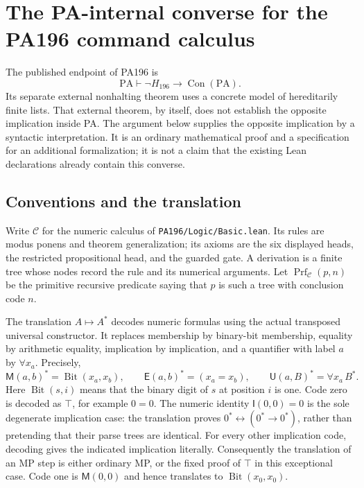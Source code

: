 \section{The PA-internal converse for the PA196 command calculus}
\label{sec:internal-converse}

The published endpoint of PA196 is
\[
  \mathrm{PA}\vdash \neg H_{196}\longrightarrow\operatorname{Con}(\mathrm{PA}).
\]
Its separate external nonhalting theorem uses a concrete model of hereditarily
finite lists.  That external theorem, by itself, does not establish the
opposite implication inside PA.  The argument below supplies the opposite
implication by a syntactic interpretation.  It is an ordinary mathematical
proof and a specification for an additional formalization; it is not a claim
that the existing Lean declarations already contain this converse.

\subsection{Conventions and the translation}

Write $\mathcal C$ for the numeric calculus of
\texttt{PA196/Logic/Basic.lean}. Its rules are modus ponens and theorem
generalization; its axioms are the six displayed heads, the restricted
propositional head, and the guarded gate. A derivation is a finite tree
whose nodes record the rule and its numerical arguments. Let
$\operatorname{Prf}_{\mathcal C}(p,n)$ be the primitive recursive predicate
saying that $p$ is such a tree with conclusion code $n$.

The translation $A\mapsto A^*$ decodes numeric formulas using the actual
transposed universal constructor. It replaces membership by binary-bit
membership, equality by arithmetic equality, implication by implication,
and a quantifier with label $a$ by $\forall x_a$. Precisely,
\[
  \mathsf M(a,b)^*=\operatorname{Bit}(x_a,x_b),\qquad
  \mathsf E(a,b)^*=(x_a=x_b),\qquad
  \mathsf U(a,B)^*=\forall x_a\,B^*.
\]
Here $\operatorname{Bit}(s,i)$ means that the binary digit of $s$ at
position $i$ is one. Code zero is decoded as $\top$, for example $0=0$.
The numeric identity $\mathsf I(0,0)=0$ is the sole degenerate implication
case: the translation proves $0^*\leftrightarrow(0^*\to0^*)$, rather than
pretending that their parse trees are identical. For every other implication
code, decoding gives the indicated implication literally. Consequently the
translation of an MP step is either ordinary MP, or the fixed proof of
$\top$ in this exceptional case. Code one is
$\mathsf M(0,0)$ and hence translates to
$\operatorname{Bit}(x_0,x_0)$.

